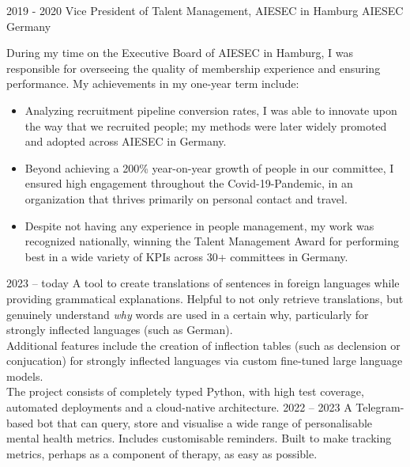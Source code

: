 \documentclass[9pt]{developercv} %
\begin{document}
\begin{entrylist}
	\entry
		{2019 - 2020}
		{Vice President of Talent Management, AIESEC in Hamburg}
		{AIESEC Germany}
		{During my time on the Executive Board of AIESEC in Hamburg, I was responsible for overseeing the quality of membership experience and ensuring performance. My achievements in my one-year term include:

        \begin{itemize}
            \item Analyzing recruitment pipeline conversion rates, I was able to innovate upon the way that we recruited people; my methods were later widely promoted and adopted across AIESEC in Germany.
            \item   Beyond achieving a 200\% year-on-year growth of people in our committee, I ensured high engagement throughout the Covid-19-Pandemic, in an organization that thrives primarily on personal contact and travel.
            \item     Despite not having any experience in people management, my work was recognized nationally, winning the Talent Management Award for performing best in a wide variety of KPIs across 30+ committees in Germany.
        \end{itemize}  
        }
\end{entrylist}




\begin{entrylist}
	\entry
		{2023 -- today}
		{}
		{ }
		{
        A tool to create translations of sentences in foreign languages while providing grammatical explanations. Helpful to not only retrieve translations, but genuinely understand \textit{why} words are used in a certain why, particularly for strongly inflected languages (such as German). \\

        Additional features include the creation of inflection tables (such as declension or conjucation) for strongly inflected languages via custom fine-tuned large language models. \\

        The project consists of completely typed Python, with high test coverage, automated deployments and a cloud-native architecture.
        }
    \entry
        {2022 -- 2023}
        {}
        { }
        {
        A Telegram-based bot that can query, store and visualise a wide range of personalisable mental health metrics. Includes customisable reminders. Built to make tracking metrics, perhaps as a component of therapy, as easy as possible.
        }
\end{entrylist}
\end{document}
